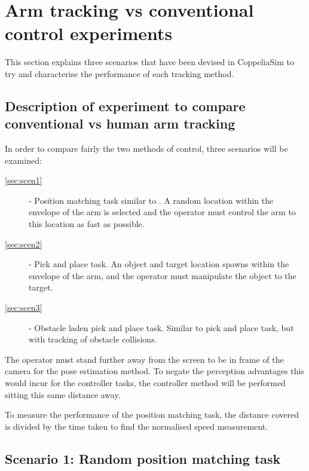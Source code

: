 \section{Arm tracking vs conventional control experiments} \label{sec:results}
\label{sec:experiments}

    This section explains three scenarios that have been devised in CoppeliaSim to try and characterise the performance of each tracking method.

  \subsection{Description of experiment to compare conventional vs human arm tracking}
    In order to compare fairly the two methods of control, three scenarios will be examined:

    \begin{description}
      \item[\autoref{sec:scen1}] - Position matching task similar to \citeauthor{ref:movementrange} \cite{ref:movementrange}. 
      A random location within the envelope of the arm is selected and the operator must control the arm to this location as fast as possible.
      \item[\autoref{sec:scen2}] - Pick and place task. 
      An object and target location spawns within the envelope of the arm, and the operator must manipulate the object to the target.
      \item[\autoref{sec:scen3}] - Obstacle laden pick and place task. 
      Similar to pick and place task, but with tracking of obstacle collisions.
    \end{description}

    The operator must stand further away from the screen to be in frame of the camera for the pose estimation method.
    To negate the perception advantages this would incur for the controller tasks, the controller method will be performed sitting this same distance away. 

    To measure the performance of the position matching task, the distance covered is divided by the time taken to find the normalised speed measurement.
  
  \subsection{Scenario 1: Random position matching task}
  \label{sec:scen1}

